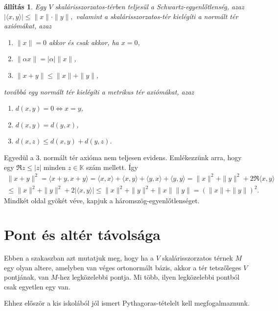 \documentclass[9pt, a4paper, showtrims]{memoir}
\makeatletter
\renewenvironment{proof}[1][\proofname]
    {\par\pushQED{\qed}%
    \normalfont \topsep6\p@\@plus6\p@\relax
    \trivlist
    \item[\hskip\labelsep
        \itshape
    #1\@addpunct{:}]\ignorespaces}
    {\popQED\endtrivlist\@endpefalse}
\theoremstyle{plain}
\newtheorem{proposition}{állítás}[chapter]
\theoremstyle{remark}
\theoremstyle{definition}
\newcommand{\ip}[2]{\langle#1,#2\rangle}
\makeatother
\begin{document}
\begin{proposition}
    Egy $V$ skalárisszorzatos-térben teljesül a \emph{Schwartz-egyenlőtlenség}, azaz 
    \(|\ip{x}{y}|\leq\|x\|\cdot\|y\|,\) 
    valamint a skalárisszorzatos-tér kielégíti a \emph{normált tér} axiómákat, azaz
    \begin{enumerate}
        \item $\|x\|=0$ akkor és csak akkor, ha $x=0$,
        \item $\|\alpha x\|=|\alpha|\|x\|$,
        \item $\|x+y\|\leq\|x\|+\|y\|$,
    \end{enumerate}
    továbbá egy normált tér kielégíti a \emph{metrikus tér} axiómákat, azaz
    \begin{enumerate}
        \item $d\left( x,y \right)=0\iff x=y$,
        \item $d\left( x,y \right)=d\left( y,x \right)$,
        \item $d\left( x,z \right)\leq d\left( x,y \right)+d\left( y,z \right)$.
            \qedhere
    \end{enumerate}
\end{proposition}
\begin{proof}
    Egyedül a 3. normált tér axióma nem teljesen evidens.
    Emlékezzünk arra, hogy egy $\Re z\leq |z|$ minden $z\in\mathbb{K}$ szám mellett.
    Így
    \begin{multline*}
        \|x+y\|^2
        =
        \ip{x+y}{x+y}
        =
        \ip{x}{x}+\ip{x}{y}+\ip{y}{x}+\ip{y}{y}
        =\|x\|^2+\|y\|^2+2\Re\ip{x}{y}
        \\
        \leq
        \|x\|^2+\|y\|^2+2|\ip{x}{y}|
        \leq
        \|x\|^2+\|y\|^2+\|x\|\|y\|
        =\left( \|x\|+\|y\| \right)^2.
    \end{multline*}
    Mindkét oldal gyökét véve, kapjuk a háromszög-egyenlőtlenséget.
\end{proof}

\section{Pont és altér távolsága}
Ebben a szakaszban azt mutatjuk meg, hogy ha a $V$ skalárisszorzatos térnek $M$ egy olyan
altere, amelyben van véges ortonormált bázis, akkor a tér tetszőleges $V$ pontjának,
van $M$-hez legközelebbi pontja.
Mi több, ilyen legközelebbi pontból csak egyetlen egy van.

Ehhez először a kis iskolából jól ismert Pythagoras-tételelt kell megfogalmaznunk.
\end{document}
